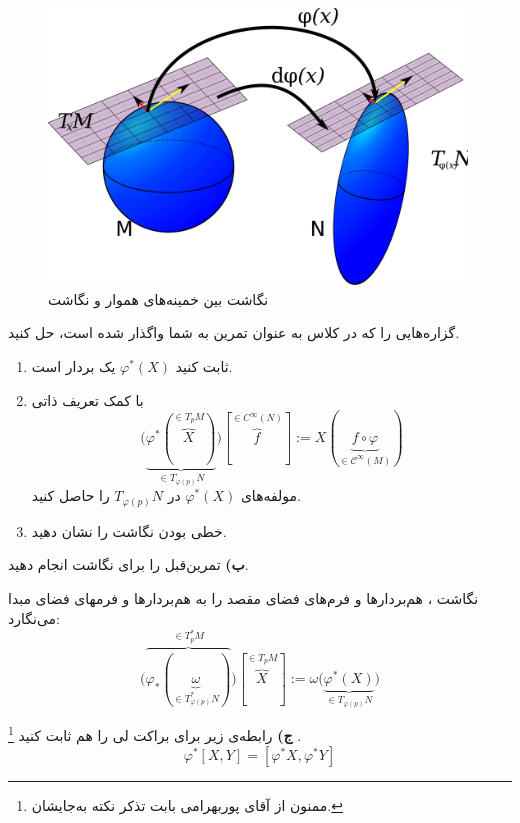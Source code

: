\documentclass{article}
\begin{document}
	 \begin{figure}[h]
	 	\centering
	 	\includegraphics[width=30em]{1.png}
	 	\caption{نگاشت بین خمینه‌های هموار و نگاشت }
	 	\label{fig1}
	 \end{figure}
گزاره‌هایی را که در کلاس به عنوان تمرین به شما واگذار شده است، حل کنید.
\begin{enumerate}
	\item ثابت کنید
	$\varphi^*(X)$
	یک بردار است.
	\item با کمک تعریف ذاتی 
	\[
	\Big(\underbrace{\varphi^*(\overbrace{X}^{\in T_pM})}_{\in T_{\varphi(p)}N}\Big)[\overbrace{f}^{\in C^\infty (N)}]  := X(\underbrace{f\circ \varphi}_{\in \mathcal{C^\infty}(M)})
	\]
	مولفه‌های $\varphi^*(X)$ در 
	$T_{\varphi(p)}N$
	را حاصل کنید.
	\item خطی بودن نگاشت  را نشان دهید.
\end{enumerate}
\thinendline

\noindent
\textbf{ب)}
تمرین‌قبل را برای نگاشت 
انجام دهید.

\noindent
نگاشت ، هم‌بردارها و فرم‌های فضای مقصد را به هم‌بردارها و فرمهای فضای مبدا می‌نگارد:
\[
\Big(\overbrace{\varphi_* (\underbrace{\omega}_{\in T^*_{\varphi(p) }N})}^{\in T^*_p M} \Big) [\overbrace{X}^{\in T_p M}] := \omega\big(
\underbrace{\varphi^*(X)}_{\in T_{\varphi(p)}N}
\big)
\]
\thinendline

\noindent
\textbf{ج)}
رابطه‌ی زیر برای براکت لی را هم ثابت کنید
\footnote{ممنون از آقای پوربهرامی بابت تذکر نکته به‌جایشان.}
.
\[
\varphi^*[X,Y] = [\varphi^*X,\varphi^*Y]
\]
\end{document}
